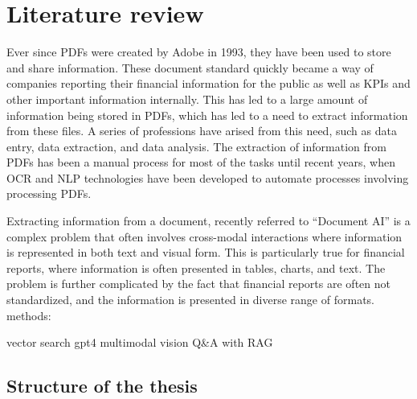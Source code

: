 \documentclass[english, 12pt, a4paper, elec, utf8, a-2b, online]{aaltothesis}
\begin{document}
\clearpage

\section{Literature review}

Ever since \ac{PDFs} were created by Adobe in 1993, they have been used to store and share information. These document standard quickly became a way of companies reporting their financial information for the public as well as KPIs and other important information internally. This has led to a large amount of information being stored in \ac{PDFs}, which has led to a need to extract information from these files. A series of professions have arised from this need, such as data entry, data extraction, and data analysis. The extraction of information from \ac{PDFs} has been a manual process for most of the tasks until recent years, when \ac{OCR} and \ac{NLP} technologies have been developed to automate processes involving processing \ac{PDFs}.

Extracting information from a document, recently referred to ``Document AI'' is a complex problem that often involves cross-modal interactions where information is represented in both text and visual form. This is particularly true for financial reports, where information is often presented in tables, charts, and text. The problem is further complicated by the fact that financial reports are often not standardized, and the information is presented in diverse range of formats.
%
methods:

vector search
gpt4 multimodal vision
Q\&A with RAG


\subsection{Structure of the thesis}
\end{document}
